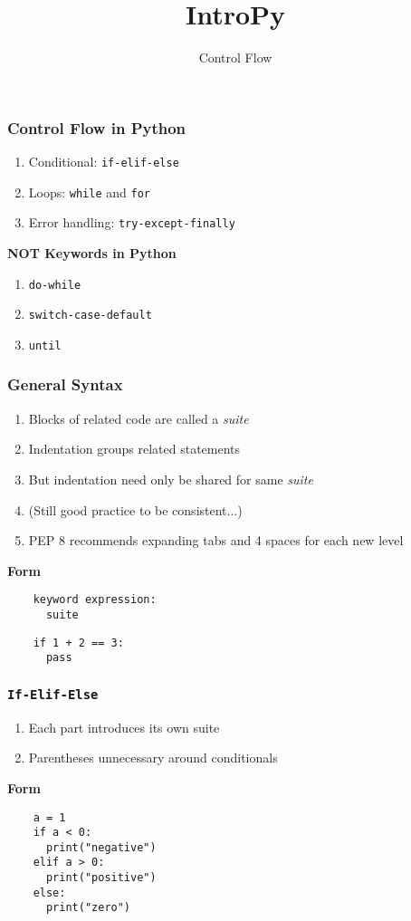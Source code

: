 \documentclass{beamer}
\title{IntroPy}
\subtitle{Control Flow}
\begin{document}
\maketitle

\begin{frame}
  \frametitle{Control Flow in Python}

  \begin{enumerate}
    \item Conditional: \texttt{if-elif-else} 
    \item Loops: \texttt{while} and \texttt{for}
    \item Error handling: \texttt{try-except-finally}
  \end{enumerate}

  \textbf{NOT Keywords in Python}
  \begin{enumerate}
    \item \texttt{do-while}
    \item \texttt{switch-case-default}
    \item \texttt{until}
  \end{enumerate}
\end{frame}


\begin{frame}[fragile]
  \frametitle{General Syntax}

  \begin{enumerate}
    \item Blocks of related code are called a \textit{suite}
    \item Indentation groups related statements
    \item But indentation need only be shared for same \textit{suite} 
    \item (Still good practice to be consistent...)
    \item PEP 8 recommends expanding tabs and 4 spaces for each new level
  \end{enumerate}

  \textbf{Form}
  \begin{lstlisting}
    keyword expression:
      suite
  \end{lstlisting}

  \begin{lstlisting}
    if 1 + 2 == 3:
      pass
  \end{lstlisting}
\end{frame}

\begin{frame}[fragile]
  \frametitle{\texttt{If-Elif-Else}}

  \begin{enumerate}
    \item Each part introduces its own suite
    \item Parentheses unnecessary around conditionals
  \end{enumerate}

  \textbf{Form}
  \begin{lstlisting}
    a = 1
    if a < 0:
      print("negative")
    elif a > 0:
      print("positive")
    else:
      print("zero")
  \end{lstlisting}
\end{frame}
\end{document}
